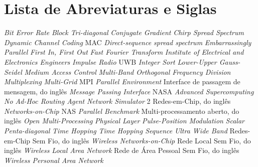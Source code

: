 \chapter*{Lista de Abreviaturas e Siglas}


\begin{acronym}
 {\textit{Bit Error Rate}}
 {\textit{Block Tri-diagonal}}
 {\textit{Conjugate Gradient}}
 {\textit{Chirp Spread Spectrum}}
 {\textit{Dynamic Channel Coding} MAC}
 {\textit{Direct-sequence spread spectrum}}
 {\textit{Embarrassingly Parallel}}
 {\textit{First In, First Out}}
 {\textit{Fast Fourier Transform}}
 {\textit{Institute of Electrical and Electronics Engineers}}
 {\textit{Impulse Radio} UWB}
 {\textit{Integer Sort}}
 {\textit{Lower-Upper Gauss-Seidel}}
 {\textit{Medium Access Control}}
 {\textit{Multi-Band Orthogonal Frequency Division Multiplexing}}
 {\textit{Multi-Grid}}
 {MPI \textit{Parallel Environment}}
 {Interface de passagem de mensagem, do inglês \textit{Message Passing Interface}}
 {NASA \textit{Advanced Supercomputing}}
 {\textit{No Ad-Hoc Routing Agent}} 
 {\textit{Network Simulator} 2}
 {Redes-em-Chip, do inglês \textit{Networks-on-Chip}}
 {NAS \textit{Parallel Benchmark}}
 {Multi-processamento aberto, do inglês \textit{Open Multi-Processing}}
 {\textit{Physical Layer}}
 {\textit{Pulse-Position Modulation}}
 {\textit{Scalar Penta-diagonal}}
 {\textit{Time Hopping}}
 {\textit{Time Hopping Sequence}}
 {\textit{Ultra Wide Band}}
 {Redes-em-Chip Sem Fio, do inglês \textit{Wireless Networks-on-Chip}}
 {Rede Local Sem Fio, do inglês \textit{Wireless Local Area Network}}
 {Rede de Área Pessoal Sem Fio, do inglês \textit{Wireless Personal Area Network}}
\end{acronym}